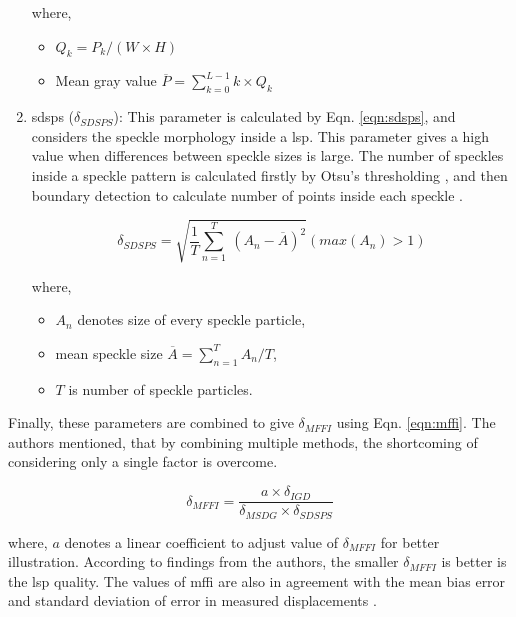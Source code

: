 \begin{enumerate}
                \noindent where,
                \begin{itemize}
                    \item \(Q_k = P_{k}/(W \times H)\)
                    \item Mean gray value \(\overline{P} = \sum_{k=0}^{L-1} k \times Q_k\)
                \end{itemize}   

            
            \item \gls{sdsps} ($\delta_{SDSPS}$): This parameter is calculated by Eqn. \ref{eqn:sdsps}, and considers the speckle morphology inside a \gls{lsp}. This parameter gives a high value when differences between speckle sizes is large. The number of speckles inside a speckle pattern is calculated firstly by Otsu's thresholding \cite{otsu}, and then boundary detection to calculate number of points inside each speckle \cite{song}.  

            \begin{equation}
                \delta_{SDSPS} = \sqrt{\frac{1}{T} \displaystyle \sum_{n=1}^{T} \  (A_n - \overline{A})^2} (max(A_n) > 1)
                \label{eqn:sdsps}
            \end{equation}

            where,
            \begin{itemize}
                \item $A_n$ denotes size of every speckle particle,
                \item mean speckle size \(\overline{A} = \sum_{n=1}^{T} A_n / T\),
                \item $T$ is number of speckle particles.
            \end{itemize} 
        \end{enumerate}

        \noindent Finally, these parameters are combined to give $\delta_{MFFI}$ using Eqn. \ref{eqn:mffi}. The authors mentioned, that by combining multiple methods, the shortcoming of considering only a single factor is overcome.

        \begin{equation}
            \delta_{MFFI} = \dfrac{a \times \delta_{IGD}}{\delta_{MSDG} \times \delta_{SDSPS}}
            \label{eqn:mffi}
        \end{equation}

        \vspace{3mm}
        \noindent where, $a$ denotes a linear coefficient to adjust value of $\delta_{MFFI}$ for better illustration. According to findings from the authors, the smaller $\delta_{MFFI}$ is better is the \gls{lsp} quality. The values of \gls{mffi} are also in agreement with the mean bias error and standard deviation of error in measured displacements \cite{song}.


